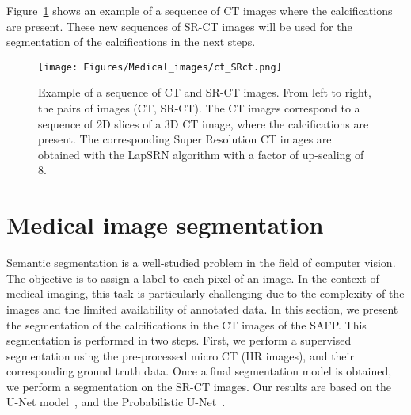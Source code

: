 Figure~\ref{fig:srct_example_2} 
shows an example of a sequence of CT images where the calcifications are present.
These new sequences of SR-CT images will be used for the 
segmentation of the calcifications in the next steps.
\begin{figure}[htb!]
    \centering
    \texttt{[image: Figures/Medical\_images/ct\_SRct.png]}
    \caption{Example of a sequence of CT and SR-CT images.  From left to right, the 
    pairs of images (CT, SR-CT).
    The CT images correspond to a sequence of 2D slices of a 3D CT image, where
    the calcifications are present. The corresponding Super Resolution CT images
    are obtained with the LapSRN algorithm with a factor of up-scaling of 8.}
    \label{fig:srct_example_2}
\end{figure}

\newpage
\section{Medical image segmentation}
Semantic segmentation is a well-studied problem in the field of computer
vision. The objective is to assign a label to each pixel of an image. In the
context of medical imaging, this task is particularly challenging due to the
complexity of the images and the limited availability of annotated data.
In this section, we present the segmentation of the calcifications in the CT images
of the SAFP. This segmentation is performed in two steps. 
First, we perform a supervised segmentation using the pre-processed micro
CT (HR images), and their corresponding ground truth data. 
Once a final segmentation  model is obtained,  we perform a
segmentation on the SR-CT images. 
Our results are based on the U-Net model~\citep{ronneberger2015u}, 
and the Probabilistic U-Net~\citep{kohl2018probabilistic}. 

